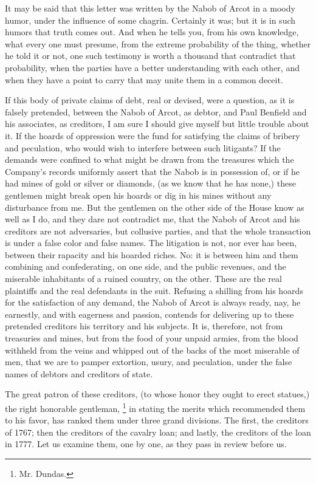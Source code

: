 It may be said that this letter was written by the Nabob of Arcot in a moody humor, under the influence of some chagrin. Certainly it was; but it is in such humors that truth comes out. And when he tells you, from his own knowledge, what every one must presume, from the extreme probability of the thing, whether he told it or not, one such testimony is worth a thousand that contradict that probability, when the parties have a better understanding with each other, and when they have a point to carry that may unite them in a common deceit.

If this body of private claims of debt, real or devised, were a question, as it is falsely pretended, between the Nabob of Arcot, as debtor, and Paul Benfield and his associates, as creditors, I am sure I should give myself but little trouble about it. If the hoards of oppression were the fund for satisfying the claims of bribery and peculation, who would wish to interfere between such litigants? If the demands were confined to what might be drawn from the treasures which the Company's records uniformly assert that the Nabob is in possession of, or if he had mines of gold or silver or diamonds, (as we know that he has none,) these gentlemen might break open his hoards or dig in his mines without any disturbance from me. But the gentlemen on the other side of the House know as well as I do, and they dare not contradict me, that the Nabob of Arcot and his creditors are not adversaries, but collusive parties, and that the whole transaction is under a false color and false names. The litigation is not, nor ever has been, between their rapacity and his hoarded riches. No: it is between him and them combining and confederating, on one side, and the public revenues, and the miserable inhabitants of a ruined country, on the other. These are the real plaintiffs and the real defendants in the suit. Refusing a shilling from his hoards for the satisfaction of any demand, the Nabob of Arcot is always ready, nay, he earnestly, and with eagerness and passion, contends for delivering up to these pretended creditors his territory and his subjects. It is, therefore, not from treasuries and mines, but from the food of your unpaid armies, from the blood withheld from the veins and whipped out of the backs of the most miserable of men, that we are to pamper extortion, usury, and peculation, under the false names of debtors and creditors of state.

The great patron of these creditors, (to whose honor they ought to erect statues,) the right honorable gentleman,
\footnote{ Mr. Dundas.}
 in stating the merits which recommended them to his favor, has ranked them under three grand divisions. The first, the creditors of 1767; then the creditors of the cavalry loan; and lastly, the creditors of the loan in 1777. Let us examine them, one by one, as they pass in review before us.


